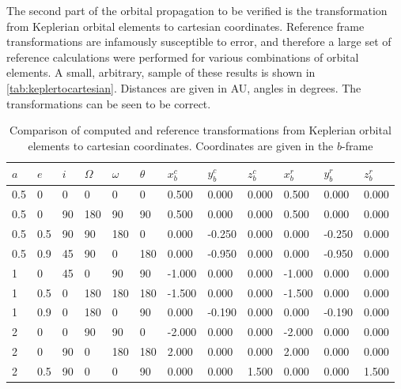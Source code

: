 The second part of the orbital propagation to be verified is the transformation from Keplerian orbital elements to cartesian coordinates. Reference frame transformations are infamously susceptible to error, and therefore a large set of reference calculations were performed for various combinations of orbital elements. A small, arbitrary, sample of these results is shown in \autoref{tab:keplertocartesian}. Distances are given in AU, angles in degrees. The transformations can be seen to be correct.\\

\begin{table}[htbp]
\centering
\caption{Comparison of computed and reference transformations from Keplerian orbital elements to cartesian coordinates. Coordinates are given in the $b$-frame}
\label{tab:keplertocartesian}
\begin{tabular}{llllll|lll|lll}
$a$   & $e$   & $i$  & $\Omega$ & $\omega$ & $\theta$ & $x_b^c$      & $y_b^c$      & $z_b^c$     & $x_b^r$  & $y_b^r$  & $z_b^r$ \\ \hline
0.5 & 0   & 0  & 0    & 0       & 0     & 0.500  & 0.000  & 0.000 & 0.500  & 0.000  & 0.000 \\
0.5 & 0   & 90 & 180  & 90      & 90    & 0.500  & 0.000  & 0.000 & 0.500  & 0.000  & 0.000 \\
0.5 & 0.5 & 90 & 90   & 180     & 0     & 0.000  & -0.250 & 0.000 & 0.000  & -0.250 & 0.000 \\
0.5 & 0.9 & 45 & 90   & 0       & 180   & 0.000  & -0.950 & 0.000 & 0.000  & -0.950 & 0.000 \\
1   & 0   & 45 & 0    & 90      & 90    & -1.000 & 0.000  & 0.000 & -1.000 & 0.000  & 0.000 \\
1   & 0.5 & 0  & 180  & 180     & 180   & -1.500 & 0.000  & 0.000 & -1.500 & 0.000  & 0.000 \\
1   & 0.9 & 0  & 180  & 0       & 90    & 0.000  & -0.190 & 0.000 & 0.000  & -0.190 & 0.000 \\
2   & 0   & 0  & 90   & 90      & 0     & -2.000 & 0.000  & 0.000 & -2.000 & 0.000  & 0.000 \\
2   & 0   & 90 & 0    & 180     & 180   & 2.000  & 0.000  & 0.000 & 2.000  & 0.000  & 0.000 \\
2   & 0.5 & 90 & 0    & 0       & 90    & 0.000  & 0.000  & 1.500 & 0.000  & 0.000  & 1.500
\end{tabular}
\end{table}

